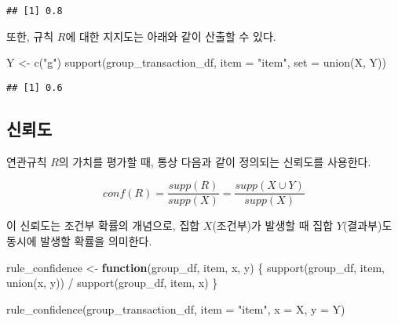\documentclass[
]{book}
\newenvironment{Shaded}{\begin{snugshade}}{\end{snugshade}}
\newcommand{\AttributeTok}[1]{\textcolor[rgb]{0.77,0.63,0.00}{#1}}
\newcommand{\ControlFlowTok}[1]{\textcolor[rgb]{0.13,0.29,0.53}{\textbf{#1}}}
\newcommand{\FunctionTok}[1]{\textcolor[rgb]{0.00,0.00,0.00}{#1}}
\newcommand{\NormalTok}[1]{#1}
\newcommand{\OtherTok}[1]{\textcolor[rgb]{0.56,0.35,0.01}{#1}}
\newcommand{\SpecialCharTok}[1]{\textcolor[rgb]{0.00,0.00,0.00}{#1}}
\newcommand{\StringTok}[1]{\textcolor[rgb]{0.31,0.60,0.02}{#1}}
\begin{document}
\begin{verbatim}
## [1] 0.8
\end{verbatim}

또한, 규칙 \(R\)에 대한 지지도는 아래와 같이 산출할 수 있다.

\begin{Shaded}
\begin{Highlighting}[]
\NormalTok{Y }\OtherTok{\textless{}{-}} \FunctionTok{c}\NormalTok{(}\StringTok{"g"}\NormalTok{)}
\FunctionTok{support}\NormalTok{(group\_transaction\_df, }\AttributeTok{item =} \StringTok{"item"}\NormalTok{, }\AttributeTok{set =} \FunctionTok{union}\NormalTok{(X, Y))}
\end{Highlighting}
\end{Shaded}

\begin{verbatim}
## [1] 0.6
\end{verbatim}

\hypertarget{association-rule-confidence}{%
\subsection{신뢰도}\label{association-rule-confidence}}

연관규칙 \(R\)의 가치를 평가할 때, 통상 다음과 같이 정의되는 신뢰도를 사용한다.

\begin{equation*}
conf(R) = \frac{supp(R)}{supp(X)} = \frac{supp(X \cup Y)}{supp(X)}
\end{equation*}

이 신뢰도는 조건부 확률의 개념으로, 집합 \(X\)(조건부)가 발생할 때 집합 \(Y\)(결과부)도 동시에 발생할 확률을 의미한다.

\begin{Shaded}
\begin{Highlighting}[]
\NormalTok{rule\_confidence }\OtherTok{\textless{}{-}} \ControlFlowTok{function}\NormalTok{(group\_df, item, x, y) \{}
  \FunctionTok{support}\NormalTok{(group\_df, item, }\FunctionTok{union}\NormalTok{(x, y)) }\SpecialCharTok{/} \FunctionTok{support}\NormalTok{(group\_df, item, x)}
\NormalTok{\}}
\end{Highlighting}
\end{Shaded}

\begin{Shaded}
\begin{Highlighting}[]
\FunctionTok{rule\_confidence}\NormalTok{(group\_transaction\_df, }\AttributeTok{item =} \StringTok{"item"}\NormalTok{, }\AttributeTok{x =}\NormalTok{ X, }\AttributeTok{y =}\NormalTok{ Y)}
\end{Highlighting}
\end{Shaded}
\end{document}
